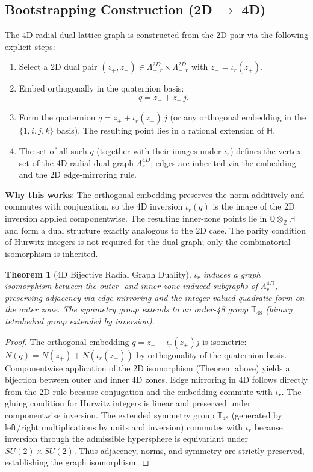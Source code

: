 \documentclass{article}
\newtheorem{theorem}{Theorem}
\begin{document}
\subsection{Bootstrapping Construction (2D \(\to\) 4D)}
The 4D radial dual lattice graph is constructed from the 2D pair via the following explicit steps:
\begin{enumerate}
  \item Select a 2D dual pair \((z_+, z_-) \in \Lambda_{+,r}^{2D} \times \Lambda_{-,r}^{2D}\) with \(z_- = \iota_r(z_+)\).
  \item Embed orthogonally in the quaternion basis:
        \[
        q = z_+ + z_- \, j.
        \]
  \item Form the quaternion \(q = z_+ + \iota_r(z_+) \, j\) (or any orthogonal embedding in the \(\{1,i,j,k\}\) basis). The resulting point lies in a rational extension of \(\mathbb{H}\).
  \item The set of all such \(q\) (together with their images under \(\iota_r\)) defines the vertex set of the 4D radial dual graph \(\Lambda_r^{4D}\); edges are inherited via the embedding and the 2D edge-mirroring rule.
\end{enumerate}
\textbf{Why this works}: The orthogonal embedding preserves the norm additively and commutes with conjugation, so the 4D inversion \(\iota_r(q)\) is the image of the 2D inversion applied componentwise. The resulting inner-zone points lie in \(\mathbb{Q} \otimes_{\mathbb{Z}} \mathbb{H}\) and form a dual structure exactly analogous to the 2D case. The parity condition of Hurwitz integers is not required for the dual graph; only the combinatorial isomorphism is inherited.
\begin{theorem}[4D Bijective Radial Graph Duality]
\(\iota_r\) induces a graph isomorphism between the outer- and inner-zone induced subgraphs of \(\Lambda_r^{4D}\), preserving adjacency via edge mirroring and the integer-valued quadratic form on the outer zone. The symmetry group extends to an order-48 group \(\mathbb{T}_{48}\) (binary tetrahedral group extended by inversion).
\end{theorem}
\begin{proof}
The orthogonal embedding \(q = z_+ + \iota_r(z_+) j\) is isometric: \(N(q) = N(z_+) + N(\iota_r(z_+))\) by orthogonality of the quaternion basis. Componentwise application of the 2D isomorphism (Theorem above) yields a bijection between outer and inner 4D zones. Edge mirroring in 4D follows directly from the 2D rule because conjugation and the embedding commute with \(\iota_r\). The gluing condition for Hurwitz integers is linear and preserved under componentwise inversion. The extended symmetry group \(\mathbb{T}_{48}\) (generated by left/right multiplications by units and inversion) commutes with \(\iota_r\) because inversion through the admissible hypersphere is equivariant under \(SU(2) \times SU(2)\). Thus adjacency, norms, and symmetry are strictly preserved, establishing the graph isomorphism.
\end{proof}
\end{document}
